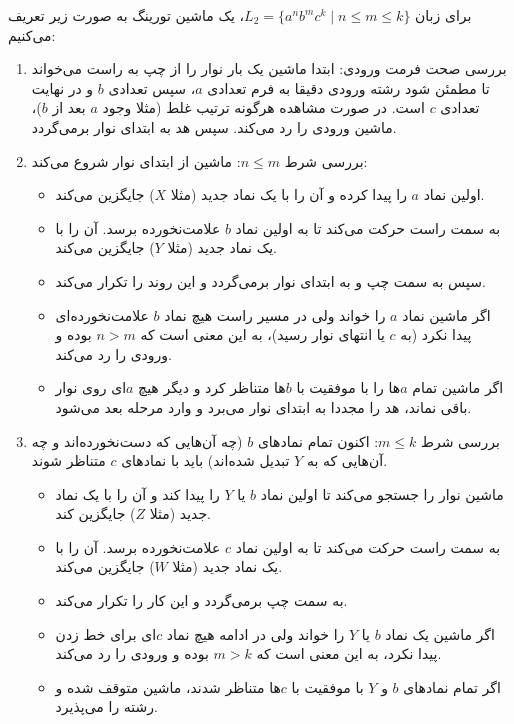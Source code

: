 برای زبان $L_2 = \{ a^n b^m c^k \mid n \le m \le k \}$، یک ماشین تورینگ به صورت زیر تعریف می‌کنیم:

\begin{enumerate}
    \item {بررسی صحت فرمت ورودی:} ابتدا ماشین یک بار نوار را از چپ به راست می‌خواند تا مطمئن شود رشته ورودی دقیقا به فرم تعدادی $a$، سپس تعدادی $b$ و در نهایت تعدادی $c$ است. در صورت مشاهده هرگونه ترتیب غلط (مثلا وجود $a$ بعد از $b$)، ماشین ورودی را رد می‌کند. سپس هد به ابتدای نوار برمی‌گردد.
    
    \item {بررسی شرط $n \le m$:} ماشین از ابتدای نوار شروع می‌کند:
    \begin{itemize}
        \item اولین نماد $a$ را پیدا کرده و آن را با یک نماد جدید (مثلا $X$) جایگزین می‌کند.
        \item به سمت راست حرکت می‌کند تا به اولین نماد $b$ علامت‌نخورده برسد. آن را با یک نماد جدید (مثلا $Y$) جایگزین می‌کند.
        \item سپس به سمت چپ و به ابتدای نوار برمی‌گردد و این روند را تکرار می‌کند.
        \item اگر ماشین نماد $a$ را خواند ولی در مسیر راست هیچ نماد $b$ علامت‌نخورده‌ای پیدا نکرد (به $c$ یا انتهای نوار رسید)، به این معنی است که $n > m$ بوده و ورودی را رد می‌کند.
        \item اگر ماشین تمام $a$ها را با موفقیت با $b$ها متناظر کرد و دیگر هیچ $a$ای روی نوار باقی نماند، هد را مجددا به ابتدای نوار می‌برد و وارد مرحله بعد می‌شود.
    \end{itemize}

    \item {بررسی شرط $m \le k$:} اکنون تمام نمادهای $b$ (چه آن‌هایی که دست‌نخورده‌اند و چه آن‌هایی که به $Y$ تبدیل شده‌اند) باید با نمادهای $c$ متناظر شوند.
    \begin{itemize}
        \item ماشین نوار را جستجو می‌کند تا اولین نماد $b$ یا $Y$ را پیدا کند و آن را با یک نماد جدید (مثلا $Z$) جایگزین کند.
        \item به سمت راست حرکت می‌کند تا به اولین نماد $c$ علامت‌نخورده برسد. آن را با یک نماد جدید (مثلا $W$) جایگزین می‌کند.
        \item به سمت چپ برمی‌گردد و این کار را تکرار می‌کند.
        \item اگر ماشین یک نماد $b$ یا $Y$ را خواند ولی در ادامه هیچ نماد $c$ای برای خط زدن پیدا نکرد، به این معنی است که $m > k$ بوده و ورودی را رد می‌کند.
        \item اگر تمام نمادهای $b$ و $Y$ با موفقیت با $c$ها متناظر شدند، ماشین متوقف شده و رشته را می‌پذیرد.
    \end{itemize}
\end{enumerate}

